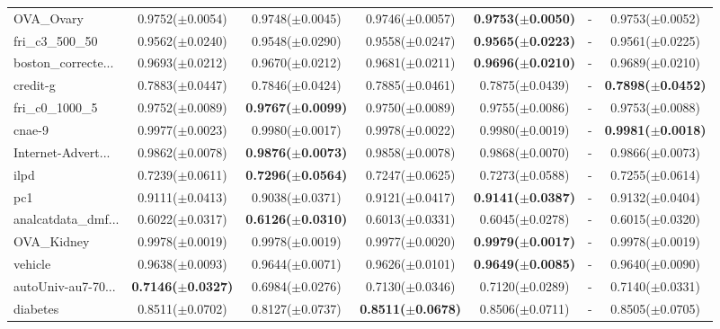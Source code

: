 \begin{longtable}{lcccccc}
OVA\_Ovary & 0.9752($\pm$0.0054) & 0.9748($\pm$0.0045) & 0.9746($\pm$0.0057) & \textbf{0.9753($\pm$0.0050)} & - & 0.9753($\pm$0.0052) \\
fri\_c3\_500\_50 & 0.9562($\pm$0.0240) & 0.9548($\pm$0.0290) & 0.9558($\pm$0.0247) & \textbf{0.9565($\pm$0.0223)} & - & 0.9561($\pm$0.0225) \\
boston\_correcte... & 0.9693($\pm$0.0212) & 0.9670($\pm$0.0212) & 0.9681($\pm$0.0211) & \textbf{0.9696($\pm$0.0210)} & - & 0.9689($\pm$0.0210) \\
credit-g & 0.7883($\pm$0.0447) & 0.7846($\pm$0.0424) & 0.7885($\pm$0.0461) & 0.7875($\pm$0.0439) & - & \textbf{0.7898($\pm$0.0452)} \\
fri\_c0\_1000\_5 & 0.9752($\pm$0.0089) & \textbf{0.9767($\pm$0.0099)} & 0.9750($\pm$0.0089) & 0.9755($\pm$0.0086) & - & 0.9753($\pm$0.0088) \\
cnae-9 & 0.9977($\pm$0.0023) & 0.9980($\pm$0.0017) & 0.9978($\pm$0.0022) & 0.9980($\pm$0.0019) & - & \textbf{0.9981($\pm$0.0018)} \\
Internet-Advert... & 0.9862($\pm$0.0078) & \textbf{0.9876($\pm$0.0073)} & 0.9858($\pm$0.0078) & 0.9868($\pm$0.0070) & - & 0.9866($\pm$0.0073) \\
ilpd & 0.7239($\pm$0.0611) & \textbf{0.7296($\pm$0.0564)} & 0.7247($\pm$0.0625) & 0.7273($\pm$0.0588) & - & 0.7255($\pm$0.0614) \\
pc1 & 0.9111($\pm$0.0413) & 0.9038($\pm$0.0371) & 0.9121($\pm$0.0417) & \textbf{0.9141($\pm$0.0387)} & - & 0.9132($\pm$0.0404) \\
analcatdata\_dmf... & 0.6022($\pm$0.0317) & \textbf{0.6126($\pm$0.0310)} & 0.6013($\pm$0.0331) & 0.6045($\pm$0.0278) & - & 0.6015($\pm$0.0320) \\
OVA\_Kidney & 0.9978($\pm$0.0019) & 0.9978($\pm$0.0019) & 0.9977($\pm$0.0020) & \textbf{0.9979($\pm$0.0017)} & - & 0.9978($\pm$0.0019) \\
vehicle & 0.9638($\pm$0.0093) & 0.9644($\pm$0.0071) & 0.9626($\pm$0.0101) & \textbf{0.9649($\pm$0.0085)} & - & 0.9640($\pm$0.0090) \\
autoUniv-au7-70... & \textbf{0.7146($\pm$0.0327)} & 0.6984($\pm$0.0276) & 0.7130($\pm$0.0346) & 0.7120($\pm$0.0289) & - & 0.7140($\pm$0.0331) \\
diabetes & 0.8511($\pm$0.0702) & 0.8127($\pm$0.0737) & \textbf{0.8511($\pm$0.0678)} & 0.8506($\pm$0.0711) & - & 0.8505($\pm$0.0705) \\
\bottomrule
\end{longtable}

